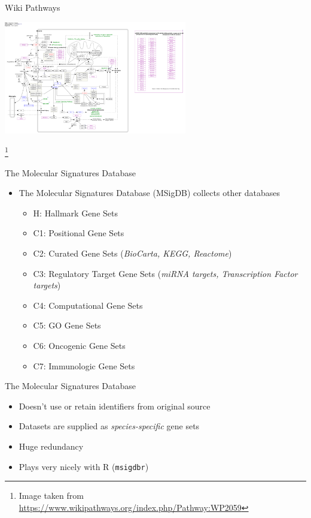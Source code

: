 \documentclass[aspectratio=169,11pt]{beamer}
\newcommand\blfootnote[1]{%
  \begingroup
  \renewcommand\thefootnote{}\footnote{#1}%
  \addtocounter{footnote}{-1}%
  \endgroup
}
\begin{document}
\begin{frame}{Wiki Pathways}

	\begin{center}
	\includegraphics[width=0.6\textwidth]{figures/WP2059_108233.png} 
	\end{center}
	
	\blfootnote{Image taken from \url{https://www.wikipathways.org/index.php/Pathway:WP2059}}

\end{frame}


\begin{frame}{The Molecular Signatures Database}

	\begin{itemize}
		\item The Molecular Signatures Database (MSigDB) collects other databases
		\begin{itemize}
			\item H: Hallmark Gene Sets
			\item C1: Positional Gene Sets
			\item C2: Curated Gene Sets (\textit{BioCarta, KEGG, Reactome})
			\item C3: Regulatory Target Gene Sets (\textit{miRNA targets, Transcription Factor targets})
			\item C4: Computational Gene Sets
			\item C5: GO Gene Sets
			\item C6: Oncogenic Gene Sets
			\item C7: Immunologic Gene Sets
		\end{itemize}
	\end{itemize}

\end{frame}

\begin{frame}{The Molecular Signatures Database}

	\begin{itemize}
		\item Doesn't use or retain identifiers from original source
		\item Datasets are supplied as \textit{species-specific} gene sets
		\item Huge redundancy
		\item Plays very nicely with R (\texttt{msigdbr})
	\end{itemize}

\end{frame}
\end{document}
